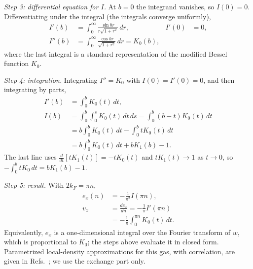 \documentclass[aps,prb,twocolumn,superscriptaddress,floatfix,longbibliography]{revtex4-2}
\theoremstyle{remark}
\begin{document}
\emph{Step 3: differential equation for $I$.} At $b=0$ the integrand vanishes, so $I(0)=0$. Differentiating under the
integral (the integrals converge uniformly),
\begin{align}
I'(b)&=\int_0^\infty\frac{\sin br}{r\sqrt{1+r^2}}\,dr,&I'(0)&=0,\\
I''(b)&=\int_0^\infty\frac{\cos br}{\sqrt{1+r^2}}\,dr=K_0(b),
\end{align}
where the last integral is a standard representation of the modified Bessel function $K_0$.

\emph{Step 4: integration.} Integrating $I''=K_0$ with $I(0)=I'(0)=0$, and then integrating by parts,
\begin{align}
I'(b)&=\int_0^bK_0(t)\,dt,\nonumber\\
I(b)&=\int_0^b\!\!\int_0^sK_0(t)\,dt\,ds=\int_0^b(b-t)K_0(t)\,dt\nonumber\\
&=b\int_0^bK_0(t)\,dt-\int_0^btK_0(t)\,dt\nonumber\\
&=b\int_0^bK_0(t)\,dt+bK_1(b)-1 .
\end{align}
The last line uses $\frac{d}{dt}[tK_1(t)]=-tK_0(t)$ and $tK_1(t)\to1$ as $t\to0$, so
$-\int_0^btK_0\,dt=bK_1(b)-1$.

\emph{Step 5: result.} With $2k_F=\pi n$,
\begin{align}
e_x(n)&=-\frac{1}{\pi^2}I(\pi n),\nonumber\\
v_x&=\frac{de_x}{dn}=-\frac{1}{\pi}I'(\pi n)\nonumber\\
&=-\frac1\pi\int_0^{\pi n}K_0(t)\,dt .
\end{align}
Equivalently, $e_x$ is a one-dimensional integral over the Fourier transform of $w$, which is proportional to $K_0$; the
steps above evaluate it in closed form. Parametrized local-density approximations for this gas, with correlation, are given in
Refs.~\cite{Helbig2011,Wagner2012}; we use the exchange part only.


\end{document}
